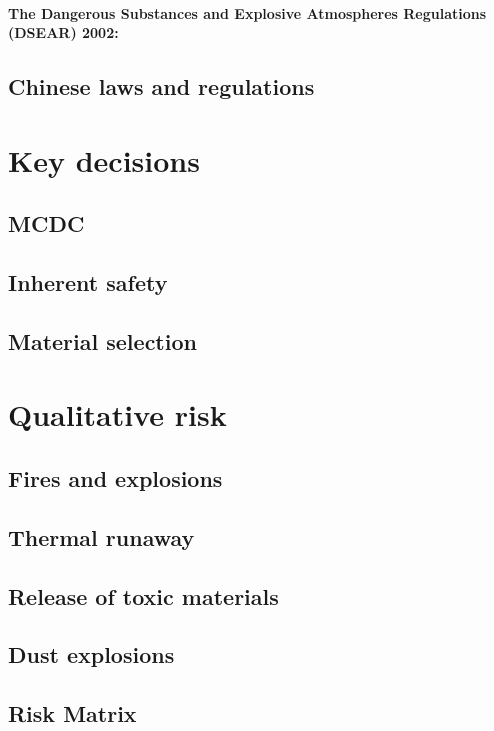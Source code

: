 \paragraph{The Dangerous Substances and Explosive Atmospheres Regulations (DSEAR) 2002:}


\subsection{Chinese laws and regulations}

\section{Key decisions}

\subsection{MCDC}
\subsection{Inherent safety}
\subsection{Material selection}

\section{Qualitative risk}
\subsection{Fires and explosions}
\subsection{Thermal runaway}
\subsection{Release of toxic materials}
\subsection{Dust explosions}
\subsection{Risk Matrix}
